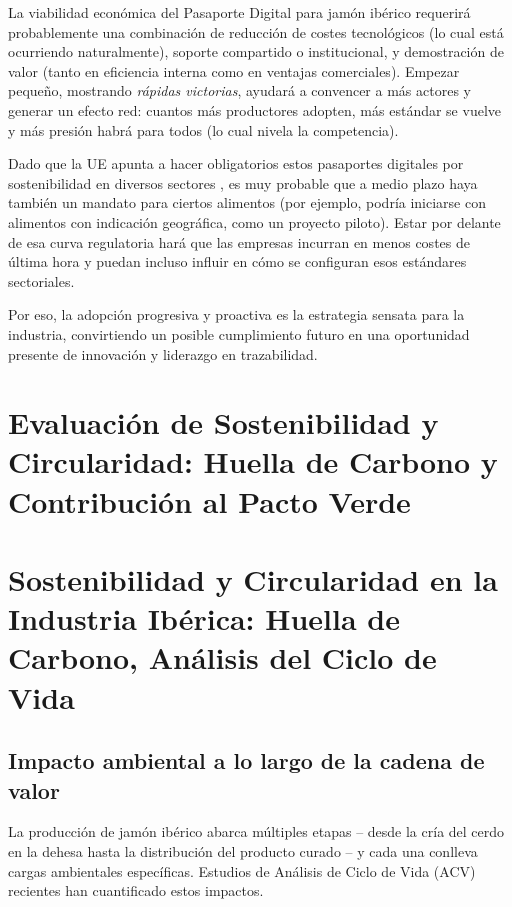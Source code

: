 La viabilidad económica del Pasaporte Digital para jamón ibérico requerirá probablemente una combinación de reducción de costes tecnológicos (lo cual está ocurriendo naturalmente), soporte compartido o institucional, y demostración de valor (tanto en eficiencia interna como en ventajas comerciales). Empezar pequeño, mostrando \textit{rápidas victorias}, ayudará a convencer a más actores y generar un efecto red: cuantos más productores adopten, más estándar se vuelve y más presión habrá para todos (lo cual nivela la competencia).

Dado que la UE apunta a hacer obligatorios estos pasaportes digitales por sostenibilidad en diversos sectores \cite{noauthor_communication_2025}, es muy probable que a medio plazo haya también un mandato para ciertos alimentos (por ejemplo, podría iniciarse con alimentos con indicación geográfica, como un proyecto piloto). Estar por delante de esa curva regulatoria hará que las empresas incurran en menos costes de última hora y puedan incluso influir en cómo se configuran esos estándares sectoriales.

Por eso, la adopción progresiva y proactiva es la estrategia sensata para la industria, convirtiendo un posible cumplimiento futuro en una oportunidad presente de innovación y liderazgo en trazabilidad.

\section{Evaluación de Sostenibilidad y Circularidad: Huella de Carbono y Contribución al Pacto Verde}\label{sec:evaluacion-sostenibilidad1}

\section{Sostenibilidad y Circularidad en la Industria Ibérica: Huella de Carbono, Análisis del Ciclo de Vida}\label{sec:evaluacion-sostenibilidad2}
\subsection{Impacto ambiental a lo largo de la cadena de valor}
La producción de jamón ibérico abarca múltiples etapas – desde la cría del cerdo en la dehesa hasta la distribución del producto curado – y cada una conlleva cargas ambientales específicas. Estudios de Análisis de Ciclo de Vida (ACV) recientes han cuantificado estos impactos.

